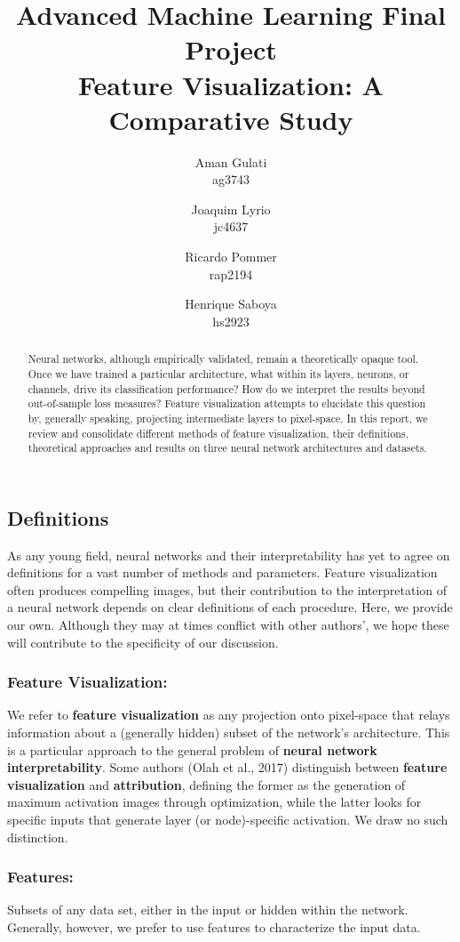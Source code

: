 \documentclass[12pt]{article}
\title{Advanced Machine Learning Final Project \\
	Feature Visualization: A Comparative Study}
\author{
	Aman Gulati \\
	ag3743 \\
	\and 
	Joaquim Lyrio  \\
	jc4637 \\
	\and 
	Ricardo Pommer \\
	rap2194 \\
	\and
	Henrique Saboya \\
	hs2923 \\
}
\begin{document}
\maketitle

\begin{abstract}
	Neural networks, although empirically validated, remain a theoretically opaque tool. Once we have trained a particular architecture, what within its layers, neurons, or channels, drive its classification performance? How do we interpret the results beyond out-of-sample loss measures? Feature visualization attempts to elucidate this question by, generally speaking, projecting intermediate layers to pixel-space. In this report,  we review and consolidate different methods of feature visualization, their definitions, theoretical approaches and results on three neural network architectures and datasets.
\end{abstract}

\subsection{Definitions}
As any young field, neural networks and their interpretability has yet to agree on definitions for a vast number of methods and parameters. Feature visualization often produces compelling images, but their contribution to the interpretation of a neural network depends on clear definitions of each procedure. Here, we provide our own. Although they may at times conflict with other authors', we hope these will contribute to the specificity of our discussion.

\subsubsection{Feature Visualization:}
We refer to \textbf{feature visualization} as any projection onto pixel-space that relays information about a (generally hidden) subset of the network's architecture. This is a particular approach to the general problem of \textbf{neural network interpretability}. Some authors (Olah et al., 2017) \cite{distill} distinguish between \textbf{feature visualization} and \textbf{attribution}, defining the former as the generation of maximum activation images through optimization, while the latter looks for specific inputs that generate layer (or node)-specific activation. We draw no such distinction.

\subsubsection{Features:}
Subsets of any data set, either in the input or hidden within the network. Generally, however, we prefer to use features to characterize the input data.
\end{document}
